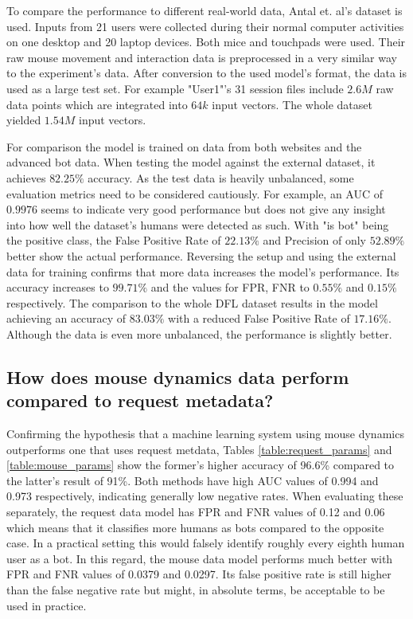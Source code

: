 \documentclass[
    fontsize=12pt,
    headings=small,
    parskip=half,           %
    bibliography=totoc,
    numbers=noenddot,       %
    open=any,               %
    final,                   %
    table
]{scrreprt}
\begin{document}
To compare the performance to different real-world data, Antal et. al's dataset \cite{9111596} is used. Inputs from 21 users were collected during their normal computer activities on one desktop and 20 laptop devices. Both mice and touchpads were used. Their raw mouse movement and interaction data is preprocessed in a very similar way to the experiment's data. After conversion to the used model's format, the data is used as a large test set. For example "User1"'s 31 session files include $2.6M$ raw data points which are integrated into $64k$ input vectors. The whole dataset yielded $1.54M$ input vectors.

For comparison the model is trained on data from both websites and the advanced bot data. When testing the model against the external dataset, it achieves $82.25\%$ accuracy. As the test data is heavily unbalanced, some evaluation metrics need to be considered cautiously. For example, an AUC of $0.9976$ seems to indicate very good performance but does not give any insight into how well the dataset's humans were detected as such. With "is bot" being the positive class, the False Positive Rate of $22.13\%$ and Precision of only $52.89\%$ better show the actual performance. Reversing the setup and using the external data for training confirms that more data increases the model's performance. Its accuracy increases to $99.71\%$ and the values for FPR, FNR to $0.55\%$ and $0.15\%$ respectively. The comparison to the whole DFL dataset results in the model achieving an accuracy of $83.03\%$ with a reduced False Positive Rate of $17.16\%$. Although the data is even more unbalanced, the performance is slightly better.


\subsection{How does mouse dynamics data perform compared to request metadata?}

Confirming the hypothesis that a machine learning system using mouse dynamics outperforms one that uses request metdata, Tables \ref{table:request_params} and \ref{table:mouse_params} show the former's higher accuracy of 96.6\% compared to the latter's result of 91\%. Both methods have high AUC values of 0.994 and 0.973 respectively, indicating generally low negative rates. When evaluating these separately, the request data model has FPR and FNR values of 0.12 and 0.06 which means that it classifies more humans as bots compared to the opposite case. In a practical setting this would falsely identify roughly every eighth human user as a bot. In this regard, the mouse data model performs much better with FPR and FNR values of 0.0379 and 0.0297. Its false positive rate is still higher than the false negative rate but might, in absolute terms, be acceptable to be used in practice.
\end{document}
